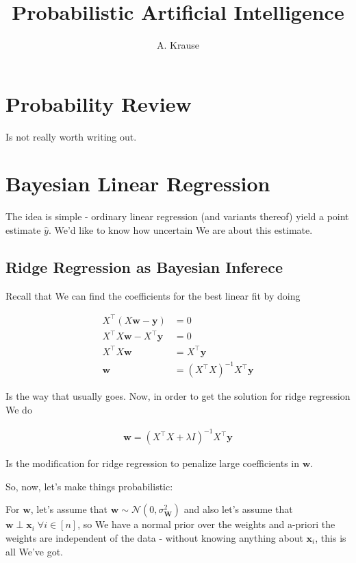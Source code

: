 \documentclass{article}
\begin{document}
\title{Probabilistic Artificial Intelligence}
\author{A. Krause}
\date{}

\maketitle

\section{Probability Review}

	Is not really worth writing out.
						

\section{Bayesian Linear Regression}

	The idea is simple - ordinary linear regression (and variants thereof) yield a point estimate $\hat{y}$. We'd like to know how uncertain We are about this estimate.
	
	\subsection{Ridge Regression as Bayesian Inferece}
	
		Recall that We can find the coefficients for the best linear fit by doing
		
		\begin{align}
			X^\top (X\mathbf{w} - \mathbf{y}) &= 0\\
			X^\top X\mathbf{w} - X^\top \mathbf{y} &= 0\\
			X^\top X\mathbf{w} &= X^\top \mathbf{y} \\
			\mathbf{w} &= (X^\top X)^{-1}X^\top \mathbf{y}
		\end{align}
		
		Is the way that usually goes. Now, in order to get the solution for ridge regression We do
		
		\begin{align}
			\mathbf{w} = (X^\top X + \lambda I)^{-1}X^\top \mathbf{y}
		\end{align}
				
		Is the modification for ridge regression to penalize large coefficients in $\mathbf{w}$. 
	
		So, now, let's make things probabilistic: 
		
		For $\mathbf{w}$, let's assume that $\mathbf{w}\sim\mathcal{N}(0, \sigma^2_{\mathbf{W}})$ and also let's assume that $\mathbf{w}\perp\mathbf{x}_i \;\forall i\in [n]$, so We have a normal prior over the weights and a-priori the weights are independent of the data - without knowing anything about $\mathbf{x}_i$, this is all We've got.
		
\end{document}
